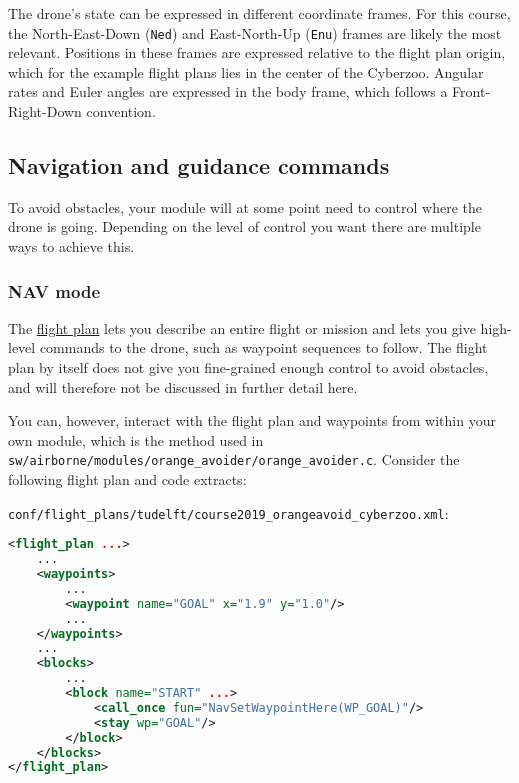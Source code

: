 \documentclass{article}
\begin{document}
The drone's state can be expressed in different coordinate frames. For this course, the North-East-Down (\texttt{Ned}) and East-North-Up (\texttt{Enu}) frames are likely the most relevant. Positions in these frames are expressed relative to the flight plan origin, which for the example flight plans lies in the center of the Cyberzoo. Angular rates and Euler angles are expressed in the body frame, which follows a Front-Right-Down convention.


\subsection{Navigation and guidance commands}
To avoid obstacles, your module will at some point need to control where the drone is going. Depending on the level of control you want there are multiple ways to achieve this.

\subsubsection{NAV mode}
The \href{https://wiki.paparazziuav.org/wiki/Flight_Plans}{flight plan} lets you describe an entire flight or mission and lets you give high-level commands to the drone, such as waypoint sequences to follow. The flight plan by itself does not give you fine-grained enough control to avoid obstacles, and will therefore not be discussed in further detail here.

You can, however, interact with the flight plan and waypoints from within your own module, which is the method used in \texttt{sw/airborne/modules/orange\_avoider/orange\_avoider.c}. Consider the following flight plan and code extracts:

\texttt{conf/flight\_plans/tudelft/course2019\_orangeavoid\_cyberzoo.xml}:
\begin{lstlisting}[language=xml]
<flight_plan ...>
	...
	<waypoints>
		...
		<waypoint name="GOAL" x="1.9" y="1.0"/>
		...
	</waypoints>
	...
	<blocks>
		...
		<block name="START" ...>
			<call_once fun="NavSetWaypointHere(WP_GOAL)"/>
			<stay wp="GOAL"/>
		</block>
	</blocks>
</flight_plan>
\end{lstlisting}
\end{document}
